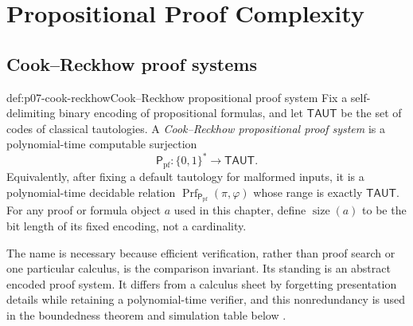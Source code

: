 
\chapter{Propositional Proof Complexity}
\label{sec:p07-proof-complexity}

\section{Cook--Reckhow proof systems}
\label{sec:p07-cook-reckhow}

\begin{hbdefinition}{def:p07-cook-reckhow}{Cook--Reckhow propositional proof system}
Fix a self-delimiting binary encoding of propositional formulas, and let
\(\mathsf{TAUT}\) be the set of codes of classical tautologies.  A
\emph{Cook--Reckhow propositional proof system} is a polynomial-time
computable surjection
\[
  \mathsf P_{\mathrm{pf}}:\{0,1\}^{*}\longrightarrow\mathsf{TAUT}.
\]
Equivalently, after fixing a default tautology for malformed inputs, it is a
polynomial-time decidable relation
\(\operatorname{Prf}_{\mathsf P_{\mathrm{pf}}}(\pi,\varphi)\) whose range is exactly
\(\mathsf{TAUT}\).  For any proof or formula object \(a\) used in this chapter,
define \(\operatorname{size}(a)\) to be the bit length of its fixed encoding,
not a cardinality.

The name is necessary because efficient verification, rather than proof
search or one particular calculus, is the comparison invariant.  Its standing
is an abstract encoded proof system.  It differs from a calculus sheet by
forgetting presentation details while retaining a polynomial-time verifier,
and this nonredundancy is used in the boundedness theorem and simulation table
below \cite{CookReckhow1979}.
\end{hbdefinition}


